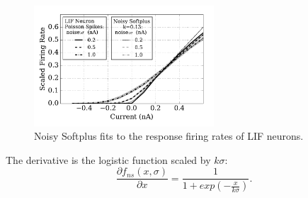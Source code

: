 	\begin{figure}
		\centering
		\includegraphics[width=0.6\textwidth]{pics_iconip/4-1.pdf}
		\caption{Noisy Softplus fits to the response firing rates of LIF neurons.}
		\label{Fig:nsptau1}
	\end{figure}		
	
	The derivative is the logistic function scaled by $k\sigma$:
	\begin{equation}
	\frac{\partial f_{ns}(x,\sigma)}{\partial x} = \frac{1}{1+exp(-\frac{x}{k\sigma})}.
	\label{equ:logist}
	\end{equation}	
	
